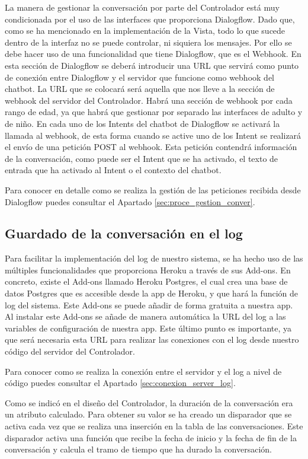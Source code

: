La manera de gestionar la conversación por parte del Controlador está muy condicionada por el uso de las interfaces que proporciona Dialogflow. Dado que, como se ha mencionado en la implementación de la Vista, todo lo que sucede dentro de la interfaz no se puede controlar, ni siquiera los mensajes. Por ello se debe hacer uso de una funcionalidad que tiene Dialogflow, que es el Webhook. En esta sección de Dialogflow se deberá introducir una URL que servirá como punto de conexión entre Dialogflow y el servidor que funcione como webhook del chatbot. La URL que se colocará será aquella que nos lleve a la sección de webhook del servidor del Controlador. Habrá una sección de webhook por cada rango de edad, ya que habrá que gestionar por separado las interfaces de adulto y de niño. En cada uno de los Intents del chatbot de Dialogflow se activará la llamada al webhook, de esta forma cuando se active uno de los Intent se realizará el envío de una petición POST al webhook. Esta petición contendrá información de la conversación, como puede ser el Intent que se ha activado, el texto de entrada que ha activado al Intent o el contexto del chatbot.

Para conocer en detalle como se realiza la gestión de las peticiones recibida desde Dialogflow puedes consultar el Apartado \ref{sec:proce_gestion_conver}.

\subsection{Guardado de la conversación en el log} \label{subsec:guardado_conver}

Para facilitar la implementación del log de nuestro sistema, se ha hecho uso de las múltiples funcionalidades que proporciona Heroku a través de sus \gls{Add-ons}. En concreto, existe el \gls{Add-ons} llamado Heroku Postgres, el cual crea una base de datos Postgres que es accesible desde la app de Heroku, y que hará la función de log del sistema. Este \gls{Add-ons} se puede añadir de forma gratuita a nuestra app. Al instalar este \gls{Add-ons} se añade de manera automática la URL del log a las variables de configuración de nuestra app. Este último punto es importante, ya que será necesaria esta URL para realizar las conexiones con el log desde nuestro código del servidor del Controlador.

Para conocer como se realiza la conexión entre el servidor y el log a nivel de código puedes consultar el Apartado \ref{sec:conexion_server_log}.

Como se indicó en el diseño del Controlador, la duración de la conversación era un atributo calculado. Para obtener su valor se ha creado un disparador que se activa cada vez que se realiza una inserción en la tabla de las conversaciones. Este disparador activa una función que recibe la fecha de inicio y la fecha de fin de la conversación y calcula el tramo de tiempo que ha durado la conversación.


